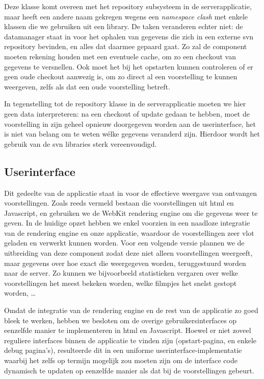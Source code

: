 Deze klasse komt overeen met het repository subsysteem in de serverapplicatie, maar heeft een andere naam gekregen wegens een \emph{namespace clash} met enkele klassen die we gebruiken uit een library. De taken veranderen echter niet: de datamanager staat in  voor het ophalen van gegevens die zich in een externe \ac{svn} repository bevinden, en alles dat daarmee gepaard gaat. Zo zal de component moeten rekening houden met een eventuele cache, om zo een checkout van gegevens te versnellen. Ook moet het bij het opstarten kunnen controleren of er geen oude checkout aanwezig is, om zo direct al een voorstelling te kunnen weergeven, zelfs als dat een oude voorstelling betreft.

In tegenstelling tot de repository klasse in de serverapplicatie moeten we hier geen data interpreteren: na een checkout of update gedaan te hebben, moet de voorstelling in zijn geheel opnieuw doorgegeven worden aan de userinterface, het is niet van belang om te weten wélke gegevens veranderd zijn. Hierdoor wordt het gebruik van de \ac{svn} libraries sterk vereenvoudigd.


\subsection{Userinterface}
\label{kiosk:structuur:userinterface}

Dit gedeelte van de applicatie staat in voor de effectieve weergave van ontvangen voorstellingen. Zoals reeds vermeld bestaan die voorstellingen uit \ac{html} en Javascript, en gebruiken we de WebKit rendering engine om die gegevens weer te geven. In de huidige opzet hebben we enkel voorzien in een naadloze integratie van de rendering engine en onze applicatie, waardoor de voorstellingen zeer vlot geladen en verwerkt kunnen worden. Voor een volgende versie plannen we de uitbreiding van deze component zodat deze niet alleen voorstellingen weergeeft, maar gegevens over hoe exact die weergegeven worden, teruggestuurd worden naar de server. Zo kunnen we bijvoorbeeld statistieken vergaren over welke voorstellingen het meest bekeken worden, welke filmpjes het snelst gestopt worden, \ldots

Omdat de integratie van de rendering engine en de rest van de applicatie zo goed bleek te werken, hebben we besloten om de overige gebruikersinterfaces op eenzelfde manier te implementeren in \ac{html} en Javascript. Hoewel er niet zoveel reguliere interfaces binnen de applicatie te vinden zijn (opstart-pagina, en enkele debug pagina's), resulteerde dit in een uniforme userinterface-implementatie waarbij het zelfs op termijn mogelijk zou moeten zijn om de interface code dynamisch te updaten op eenzelfde manier als dat bij de voorstellingen gebeurt.


